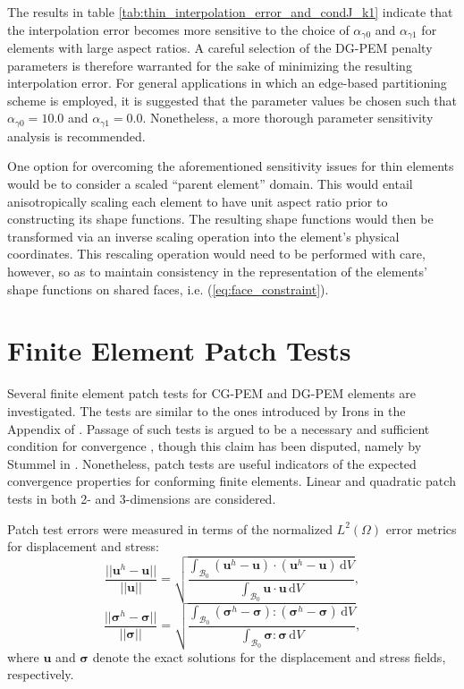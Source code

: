 The results in table \ref{tab:thin_interpolation_error_and_condJ_k1} indicate that the interpolation error becomes more sensitive to the choice of $\alpha_{\gamma0}$ and $\alpha_{\gamma1}$ for elements with large aspect ratios. A careful selection of the DG-PEM penalty parameters is therefore warranted for the sake of minimizing the resulting interpolation error. For general applications in which an edge-based partitioning scheme is employed, it is suggested that the parameter values be chosen such that $\alpha_{\gamma0} = 10.0$ and $\alpha_{\gamma1} = 0.0$. Nonetheless, a more thorough parameter sensitivity analysis is recommended.

One option for overcoming the aforementioned sensitivity issues for thin elements would be to consider a scaled ``parent element'' domain. This would entail anisotropically scaling each element to have unit aspect ratio prior to constructing its shape functions. The resulting shape functions would then be transformed via an inverse scaling operation into the element's physical coordinates. This rescaling operation would need to be performed with care, however, so as to maintain consistency in the representation of the elements' shape functions on shared faces, i.e. (\ref{eq:face_constraint}).

\section{Finite Element Patch Tests}

Several finite element patch tests for CG-PEM and DG-PEM elements are investigated. The tests are similar to the ones introduced by Irons in the Appendix of \cite{Irons:65}. Passage of such tests is argued to be a necessary and sufficient condition for convergence \cite{Simo&Taylor:86}, though this claim has been disputed, namely by Stummel in \cite{Stummel:80}. Nonetheless, patch tests are useful indicators of the expected convergence properties for conforming finite elements. Linear and quadratic patch tests in both 2- and 3-dimensions are considered.

Patch test errors were measured in terms of the normalized $L^2 (\Omega)$ error metrics for displacement and stress:
\begin{equation}
	\frac{||\bm{u}^h - \bm{u}||}{||\bm{u}||} = \sqrt{\frac{\int_{\mathcal{B}_0} (\bm{u}^h - \bm{u}) \cdot (\bm{u}^h - \bm{u}) \, \mathrm dV}{\int_{\mathcal{B}_0} \bm{u} \cdot \bm{u} \, \mathrm dV}},
\end{equation}
\begin{equation}
	\frac{||\boldsymbol{\sigma}^h - \boldsymbol{\sigma}||}{||\boldsymbol{\sigma}||} = \sqrt{\frac{\int_{\mathcal{B}_0} (\boldsymbol{\sigma}^h - \boldsymbol{\sigma}) \colon (\boldsymbol{\sigma}^h - \boldsymbol{\sigma}) \, \mathrm dV}{\int_{\mathcal{B}_0} \boldsymbol{\sigma} \colon \boldsymbol{\sigma} \, \mathrm dV}},
	\label{eq:normalized_stress_error}
\end{equation}
where $\bm{u}$ and $\boldsymbol{\sigma}$ denote the exact solutions for the displacement and stress fields, respectively.

